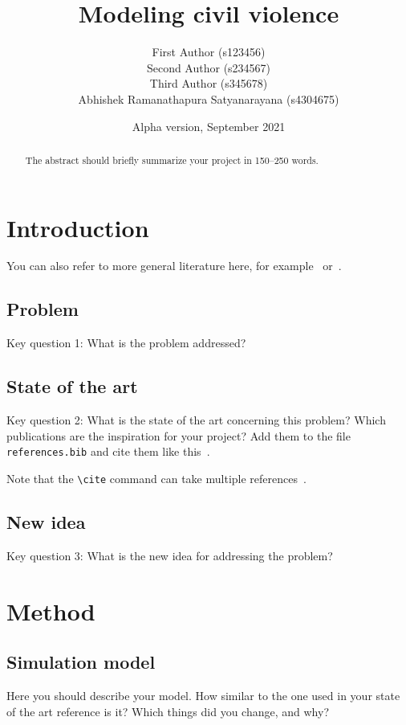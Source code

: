\documentclass[a4paper,11pt]{article}
\title{Modeling civil violence}
\author{
  First Author (s123456)
  \\
  Second Author (s234567)
  \\
  Third Author (s345678)
  \\
  Abhishek Ramanathapura Satyanarayana (s4304675)
}
\date{Alpha version, September 2021} %
\begin{document}
\maketitle

\begin{abstract}
The abstract should briefly summarize your project in 150--250 words.
\end{abstract}

\section{Introduction}

You can also refer to more general literature here, for example~\cite{WooldridgeMAS} or~\cite{wiki:SchellingSegregation}.

\subsection{Problem}

Key question 1: What is the problem addressed?

\subsection{State of the art}

Key question 2: What is the state of the art concerning this problem?
Which publications are the inspiration for your project?
Add them to the file \texttt{references.bib} and cite them like this~\cite{dWVV2013:ToM}.

Note that the \verb|\cite| command can take multiple references~\cite{vDGKK2019:ReachGossip,vdBerg2019:UnreliableGossip,HvKLL2019:SupermarketQ}.

\subsection{New idea}

Key question 3: What is the new idea for addressing the problem?

\section{Method}

\subsection{Simulation model}

Here you should describe your model.
How similar to the one used in your state of the art reference is it?
Which things did you change, and why?
\end{document}
